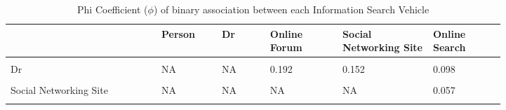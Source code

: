\begin{table}[!h]

\caption{\label{tab:model-2-phi}Phi Coefficient ($\phi$) of binary association between each Information Search Vehicle}
\centering
\begin{tabular}[t]{p{0.25\linewidth} p{0.10\linewidth} p{0.08\linewidth} p{0.12\linewidth} p{0.15\linewidth} p{0.12\linewidth}}
\hline
 & Person & Dr & Online Forum & Social Networking Site & Online Search\\
\hline
\cellcolor{gray!6}{Person} & \cellcolor{gray!6}{NA} & \cellcolor{gray!6}{0.28} & \cellcolor{gray!6}{0.172} & \cellcolor{gray!6}{0.275} & \cellcolor{gray!6}{0.216}\\

Dr & NA & NA & 0.192 & 0.152 & 0.098\\

\cellcolor{gray!6}{Online Forum} & \cellcolor{gray!6}{NA} & \cellcolor{gray!6}{NA} & \cellcolor{gray!6}{NA} & \cellcolor{gray!6}{0.371} & \cellcolor{gray!6}{-0.073}\\

Social Networking Site & NA & NA & NA & NA & 0.057\\

\cellcolor{gray!6}{Online Search} & \cellcolor{gray!6}{NA} & \cellcolor{gray!6}{NA} & \cellcolor{gray!6}{NA} & \cellcolor{gray!6}{NA} & \cellcolor{gray!6}{NA}\\
\hline
\end{tabular}
\end{table}